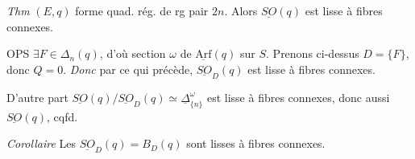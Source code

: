 \documentclass[11pt,a4paper]{article}
\begin{document}
\emph{Thm} $(E,q)$ forme quad. rég. de rg pair $2n$.
Alors $\underline{SO}(q)$ est lisse à fibres connexes.

OPS $\exists F\in\Delta_n(q)$, d'où section $\omega$ de $\underline{\mathrm{Arf}}(q)$ sur $S$.
Prenons ci-dessus $D=\{F\}$,  donc $Q=0$. \emph{Donc}
par ce qui précède, $\underline{SO}_D(q)$ est lisse à fibres connexes.

D'autre part $\underline{SO}(q)/\underline{SO}_D(q)\simeq\underline{\Delta}^{\omega}_{\{n\}}$ est
lisse à fibres connexes, donc aussi $\underline{SO}(q)$, cqfd.

\emph{Corollaire} Les $\underline{SO}_D(q)=B_D(q)$ sont lisses à fibres connexes.
\end{document}
